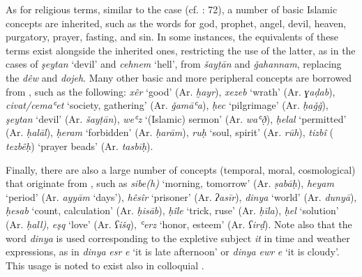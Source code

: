 \documentclass[output=paper]{langsci/langscibook}
\begin{document}
As for religious terms, similar to the  case (cf. \citealt{Perry2012}: 72), a number of basic Islamic concepts are inherited, such as the words for god, prophet, angel, devil, heaven, purgatory, prayer, fasting, and sin. In some instances, the  equivalents of these terms exist alongside the inherited ones, restricting the use of the latter, as in the cases of \textit{şeytan} ‘devil’ and \textit{cehnem} ‘hell’, from  \textit{šayṭān} and \textit{ǧahannam}, replacing the  \textit{dêw} and \textit{dojeh}. Many other basic and more peripheral concepts are borrowed from , such as the following: \textit{xêr} ‘good’ (Ar. \textit{ḫayr}), \textit{xezeb} ‘wrath’ (Ar. \textit{ɣaḍab}), \textit{civat/cemaʿet} ‘society, gathering’ (Ar. \textit{ǧamāʿa}), \textit{ḥec} ‘pilgrimage’ (Ar. \textit{ḥaǧǧ}), \textit{şeytan} ‘devil’ (Ar. \textit{šayṭān}), \textit{weʿz} ‘(Islamic) sermon’ (Ar. \textit{waʿð̣}), \textit{ḥelal} ‘permitted’ (Ar. \textit{ḥalāl}), \textit{ḥeram} ‘forbidden’ (Ar. \textit{ḥarām}), \textit{ruḥ} ‘soul, spirit’ (Ar. \textit{rūh}), \textit{tizbî} ( \textit{tezbêḥ}) ‘prayer beads’ (Ar. \textit{tasbīḥ}).  

Finally, there are also a large number of concepts (temporal, moral, cosmological) that originate from  , such as \textit{sibe(h)} ‘morning, tomorrow’ (Ar. \textit{ṣabāḥ}), \textit{heyam} ‘period’ (Ar. \textit{ayyām} ‘days’), \textit{hêsîr} ‘prisoner’ (Ar. \textit{ʔasīr}), \textit{dinya} ‘world’ (Ar. \textit{dunyā}), \textit{ḥesab} ‘count, calculation’ (Ar. \textit{ḥisāb}), \textit{ḥîle} ‘trick, ruse’ (Ar. \textit{ḥīla}), \textit{ḥel}  ‘solution’ (Ar. \textit{ḥall)}, \textit{eşq} ‘love’ (Ar. \textit{ʕišq}), \textit{ʿerz} ‘honor, esteem’ (Ar. \textit{ʕirḍ}). Note also that the word \textit{dinya} is used corresponding to the  expletive subject \textit{it} in time and weather expressions, as in \textit{dinya} \textit{esr} \textit{e} ‘it is late afternoon’ or \textit{dinya} \textit{ewr} \textit{e} ‘it is cloudy’. This usage is noted to exist also in colloquial  \citep[155]{Chyet2003}.
\end{document}
